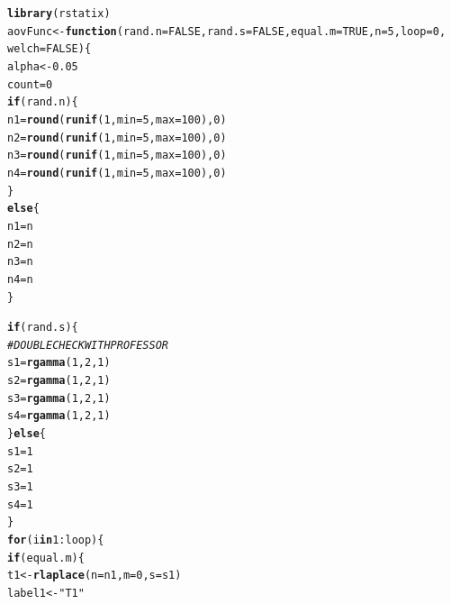 \documentclass{article}\usepackage[]{graphicx}\usepackage[]{color}
\makeatletter
\newcommand{\hlnum}[1]{\textcolor[rgb]{0.686,0.059,0.569}{#1}}%
\newcommand{\hlstr}[1]{\textcolor[rgb]{0.192,0.494,0.8}{#1}}%
\newcommand{\hlcom}[1]{\textcolor[rgb]{0.678,0.584,0.686}{\textit{#1}}}%
\newcommand{\hlopt}[1]{\textcolor[rgb]{0,0,0}{#1}}%
\newcommand{\hlstd}[1]{\textcolor[rgb]{0.345,0.345,0.345}{#1}}%
\newcommand{\hlkwa}[1]{\textcolor[rgb]{0.161,0.373,0.58}{\textbf{#1}}}%
\newcommand{\hlkwb}[1]{\textcolor[rgb]{0.69,0.353,0.396}{#1}}%
\newcommand{\hlkwc}[1]{\textcolor[rgb]{0.333,0.667,0.333}{#1}}%
\newcommand{\hlkwd}[1]{\textcolor[rgb]{0.737,0.353,0.396}{\textbf{#1}}}%
\newenvironment{kframe}{%
 \def\at@end@of@kframe{}%
 \ifinner\ifhmode%
  \def\at@end@of@kframe{\end{minipage}}%
  \begin{minipage}{\columnwidth}%
 \fi\fi%
 \def\FrameCommand##1{\hskip\@totalleftmargin \hskip-\fboxsep
 \colorbox{shadecolor}{##1}\hskip-\fboxsep
     \hskip-\linewidth \hskip-\@totalleftmargin \hskip\columnwidth}%
 \MakeFramed {\advance\hsize-\width
   \@totalleftmargin\z@ \linewidth\hsize
   \@setminipage}}%
 {\par\unskip\endMakeFramed%
 \at@end@of@kframe}
\newenvironment{knitrout}{}{} %
\makeatother
\begin{document}
\begin{enumerate}
\begin{enumerate}
\begin{knitrout}
\color{fgcolor}\begin{kframe}
\begin{alltt}
\hlkwd{library}\hlstd{(rstatix)}
\hlstd{aovFunc} \hlkwb{<-} \hlkwa{function}\hlstd{(}\hlkwc{rand.n}\hlstd{=}\hlnum{FALSE}\hlstd{,} \hlkwc{rand.s}\hlstd{=}\hlnum{FALSE}\hlstd{,} \hlkwc{equal.m}\hlstd{=}\hlnum{TRUE}\hlstd{,} \hlkwc{n}\hlstd{=}\hlnum{5}\hlstd{,} \hlkwc{loop}\hlstd{=}\hlnum{0}\hlstd{,}
                    \hlkwc{welch}\hlstd{=}\hlnum{FALSE}\hlstd{)\{}
  \hlstd{alpha}\hlkwb{<-}\hlnum{0.05}
  \hlstd{count}\hlkwb{=}\hlnum{0}
  \hlkwa{if}\hlstd{(rand.n)\{}
    \hlstd{n1}\hlkwb{=}\hlkwd{round}\hlstd{(}\hlkwd{runif}\hlstd{(}\hlnum{1}\hlstd{,} \hlkwc{min}\hlstd{=}\hlnum{5}\hlstd{,} \hlkwc{max}\hlstd{=}\hlnum{100}\hlstd{),}\hlnum{0}\hlstd{)}
    \hlstd{n2}\hlkwb{=}\hlkwd{round}\hlstd{(}\hlkwd{runif}\hlstd{(}\hlnum{1}\hlstd{,} \hlkwc{min}\hlstd{=}\hlnum{5}\hlstd{,} \hlkwc{max}\hlstd{=}\hlnum{100}\hlstd{),}\hlnum{0}\hlstd{)}
    \hlstd{n3}\hlkwb{=}\hlkwd{round}\hlstd{(}\hlkwd{runif}\hlstd{(}\hlnum{1}\hlstd{,} \hlkwc{min}\hlstd{=}\hlnum{5}\hlstd{,} \hlkwc{max}\hlstd{=}\hlnum{100}\hlstd{),}\hlnum{0}\hlstd{)}
    \hlstd{n4}\hlkwb{=}\hlkwd{round}\hlstd{(}\hlkwd{runif}\hlstd{(}\hlnum{1}\hlstd{,} \hlkwc{min}\hlstd{=}\hlnum{5}\hlstd{,} \hlkwc{max}\hlstd{=}\hlnum{100}\hlstd{),}\hlnum{0}\hlstd{)}
  \hlstd{\}}
  \hlkwa{else}\hlstd{\{}
    \hlstd{n1}\hlkwb{=}\hlstd{n}
    \hlstd{n2}\hlkwb{=}\hlstd{n}
    \hlstd{n3}\hlkwb{=}\hlstd{n}
    \hlstd{n4}\hlkwb{=}\hlstd{n}
  \hlstd{\}}

  \hlkwa{if}\hlstd{(rand.s)\{}
    \hlcom{#DOUBLE CHECK WITH PROFESSOR}
    \hlstd{s1}\hlkwb{=}\hlkwd{rgamma}\hlstd{(}\hlnum{1}\hlstd{,} \hlnum{2}\hlstd{,} \hlnum{1}\hlstd{)}
    \hlstd{s2}\hlkwb{=}\hlkwd{rgamma}\hlstd{(}\hlnum{1}\hlstd{,} \hlnum{2}\hlstd{,} \hlnum{1}\hlstd{)}
    \hlstd{s3}\hlkwb{=}\hlkwd{rgamma}\hlstd{(}\hlnum{1}\hlstd{,} \hlnum{2}\hlstd{,} \hlnum{1}\hlstd{)}
    \hlstd{s4}\hlkwb{=}\hlkwd{rgamma}\hlstd{(}\hlnum{1}\hlstd{,} \hlnum{2}\hlstd{,} \hlnum{1}\hlstd{)}
  \hlstd{\}}\hlkwa{else}\hlstd{\{}
    \hlstd{s1}\hlkwb{=}\hlnum{1}
    \hlstd{s2}\hlkwb{=}\hlnum{1}
    \hlstd{s3}\hlkwb{=}\hlnum{1}
    \hlstd{s4}\hlkwb{=}\hlnum{1}
  \hlstd{\}}
  \hlkwa{for}\hlstd{(i} \hlkwa{in} \hlnum{1}\hlopt{:}\hlstd{loop)\{}
    \hlkwa{if}\hlstd{(equal.m)\{}
      \hlstd{t1}\hlkwb{<-}\hlkwd{rlaplace}\hlstd{(}\hlkwc{n}\hlstd{=n1,} \hlkwc{m}\hlstd{=}\hlnum{0}\hlstd{,} \hlkwc{s}\hlstd{=s1)}
      \hlstd{label1}\hlkwb{<-}\hlstr{"T1"}


\end{alltt}
\end{kframe}
\end{knitrout}
\end{enumerate}
\end{enumerate}
\end{document}
